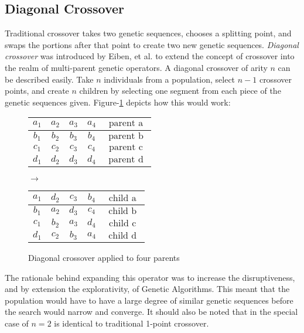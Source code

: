 \subsection*{Diagonal Crossover}
Traditional crossover takes two genetic sequences, chooses a splitting point, and swaps the portions after that point to create two new genetic sequences. \emph{Diagonal crossover} was introduced by Eiben, et al. to extend the concept of crossover into the realm of multi-parent genetic operators\cite{Eiben03}. A diagonal crossover of arity $n$ can be described easily. Take $n$ individuals from a population, select $n-1$ crossover points, and create $n$ children by selecting one segment from each piece of the genetic sequences given\cite{Eiben95}. Figure-\ref{DC-Fig} depicts how this would work\cite{Eiben95}:
\begin{figure}[h!]
\centering
\begin{tabular}{ | c | c | c | c | c | }
\hline
$a_1$ & $a_2$ & $a_3$ & $a_4$ & $\text{ parent a }$ 	\\ \hline
$b_1$ & $b_2$ & $b_3$ & $b_4$ & $\text{ parent b }$ 	\\ \hline
$c_1$ & $c_2$ & $c_3$ & $c_4$ & $\text{ parent c }$ 	\\ \hline
$d_1$ & $d_2$ & $d_3$ & $d_4$ & $\text{ parent d }$ 	\\ \hline
\end{tabular}
$\rightarrow$
\begin{tabular}{ | c | c | c | c | c | }
\hline
$a_1$ & $d_2$ & $c_3$ & $b_4$ & $\text{ child a }$ 	\\ \hline
$b_1$ & $a_2$ & $d_3$ & $c_4$ & $\text{ child b }$ 	\\ \hline
$c_1$ & $b_2$ & $a_3$ & $d_4$ & $\text{ child c }$ 	\\ \hline
$d_1$ & $c_2$ & $b_3$ & $a_4$ & $\text{ child d }$ 	\\ \hline
\end{tabular}
\caption{Diagonal crossover applied to four parents}
\label{DC-Fig}
\end{figure} 

The rationale behind expanding this operator was to increase the disruptiveness, and by extension the explorativity, of Genetic Algorithms\cite{Eiben97}. This meant that the population would have to have a large degree of similar genetic sequences before the search would narrow and converge\cite{Eiben95}. It should also be noted that in the special case of $n = 2$ is identical to traditional 1-point crossover\cite{Eiben95}.